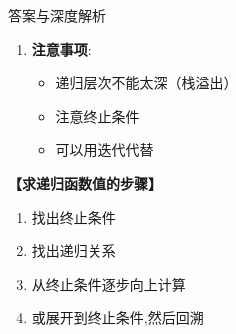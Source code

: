 \documentclass[a4paper,12pt]{article}
\begin{document}
\begin{bluebox}{答案与深度解析}
\begin{enumerate}[leftmargin=*, nosep]
		\item \textbf{注意事项}:
		      \begin{itemize}
			      \item 递归层次不能太深（栈溢出）
			      \item 注意终止条件
			      \item 可以用迭代代替
		      \end{itemize}
	\end{enumerate}

	\textbf{【求递归函数值的步骤】}
	\begin{enumerate}
		\item 找出终止条件
		\item 找出递归关系
		\item 从终止条件逐步向上计算
		\item 或展开到终止条件,然后回溯
	\end{enumerate}

\end{bluebox}
\end{document}
